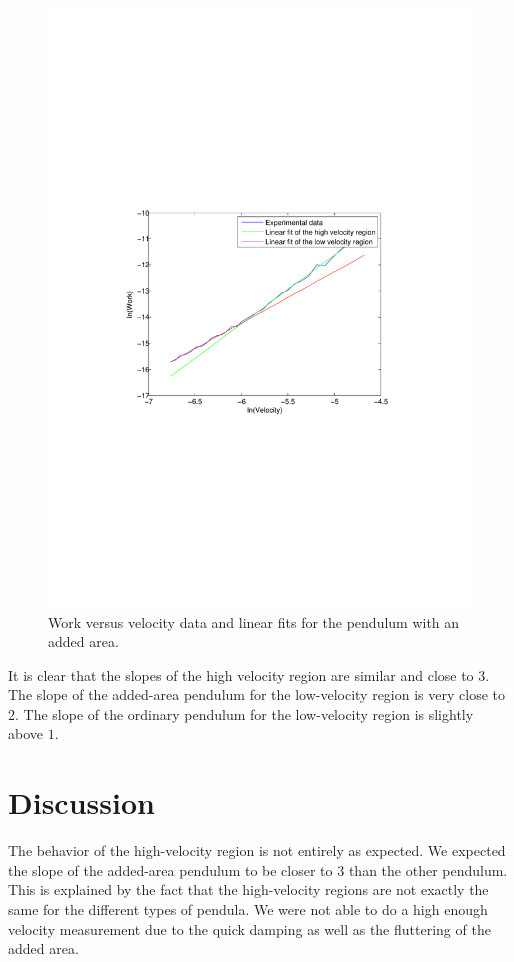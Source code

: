 \documentclass[11pt, a4paper]{article}
\begin{document}
\begin{figure}[h]
	\centering
	\includegraphics[trim=10.0cm 10.0cm 10.0cm 10.0cm, scale=0.7]{paper}
	\caption{Work versus velocity data and  linear fits for the pendulum with an added area.}
	\label{f:paper}
\end{figure}

It is clear that the slopes of the high velocity region are similar and close to $3$. 
The slope of the added-area pendulum for the low-velocity region is very close to $2$.
The slope of the ordinary pendulum for the low-velocity region is slightly above $1$.



\section{Discussion}
The behavior of the high-velocity region is not entirely as expected. We expected the slope of the added-area pendulum 
to be closer to $3$ than the other pendulum.
This is explained by the fact that the high-velocity regions are not exactly the same for the different types of pendula. We were not 
able to do a high enough velocity measurement due to the quick damping as well as the fluttering of the added area.
\end{document}
